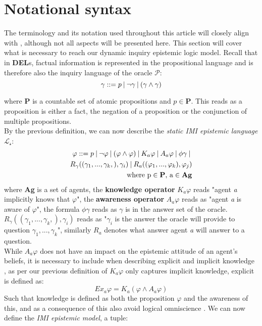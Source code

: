 \section{Notational syntax}
The terminology and its notation used throughout this article will closely align with \cite{delimi}, although not all aspects will be presented here. This section will cover what is necessary to reach our dynamic inquiry epistemic logic model. Recall that in \textbf{DEL}s, factual information is represented in the propositional language and is therefore also the inquiry language of the oracle $\mathscr{P}$:
$$
	\gamma::= p \:|\: \neg\gamma\:|\:(\gamma\land\gamma)
$$

where \textbf{P} is a countable set of atomic propositions and $p \in \mathbf{P}$. This reads as a proposition is either a fact, the negation of a proposition or the conjunction of multiple propositions.\\
By the previous definition, we can now describe the \textit{static IMI epistemic language} $\mathscr{L_s}$:
\begin{align*}
	\varphi ::= p \:|\:\neg\varphi\:|\:(\varphi \land \varphi) \:|\: K_a\varphi \:|\: A_a\varphi \:|\: \phi\gamma \:|\:\\ R_\gamma((\gamma_1,...,\gamma_k,), \gamma_i) \:|\: R_a((\varphi_1,...,\varphi_k), \varphi_j) \\ \text{where p} \in \text{\textbf{P}}\text{, a} \in \text{\textbf{Ag}}
\end{align*}
where \textbf{Ag} is a set of agents, the \textbf{knowledge operator} $K_a\varphi$ reads "agent \textit{a} implicitly knows that $\varphi$", the \textbf{awareness operator} $A_a\varphi$ reads as "agent \textit{a} is aware of $\varphi$", the formula $\phi\gamma$ reads as $\gamma$ is in the answer set of the oracle. $R_\gamma((\gamma_1,...,\gamma_k,), \gamma_i)$ reads as "$\gamma_i$ is the answer the oracle will provide to question $\gamma_1,...,\gamma_k$", similarly $R_a$ denotes what answer agent \textit{a} will answer to a question. \\
While $A_a\varphi$ does not have an impact on the epistemic attitude of an agent's beliefs, it is necessary to include when describing explicit and implicit knowledge \cite{delimi}, as per our previous definition of $K_a\varphi$ only captures implicit knowledge, explicit is defined as:
$$
	Ex_a\varphi = K_a(\varphi \land A_a\varphi)
$$
Such that knowledge is defined as both the proposition $\varphi$ and the awareness of this, and as a consequence of this also avoid logical omniscience \cite{fagin87}\cite{vanbenthem2010}. We can now define the \textit{IMI epistemic model}, a tuple:

